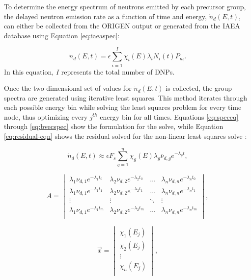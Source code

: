 \documentclass{style/nseJournal}
\begin{document}
To determine the energy spectrum of neutrons emitted by each precursor group, the delayed neutron emission rate as a function of time and energy, $\dot{n}_d(E, t)$, can either be collected from the ORIGEN output or generated from the IAEA database using Equation \eqref{eq:iaeaspec}:

\begin{equation}
\dot{n}_d(E, t) = \epsilon \sum_{i=1}^{I} \chi_i(E) \lambda_i N_{i}(t) P_{n_i}
\label{eq:iaeaspec}.
\end{equation}
In this equation, $I$ represents the total number of DNPs.

Once the two-dimensional set of values for $\dot{n}_d(E, t)$ is collected, the group spectra are generated using iterative least squares. This method iterates through each possible energy bin while solving the least squares problem for every time node, thus optimizing every $j^{th}$ energy bin for all times. Equations \eqref{eq:speceq} through \eqref{eq:bvecspec} show the formulation for the solve, while Equation \eqref{eq:residual-eqn} shows the residual solved for the non-linear least squares solve \cite{2020SciPy-NMeth, branch1999subspace}:

\begin{equation}
\dot{n}_d(E, t) \approx \epsilon F_s \sum_{g=1}^{n} \chi_g(E) \lambda_g \bar{\nu}_{d, g} e^{-\lambda_g t}
\label{eq:speceq},
\end{equation}

\begin{equation}
A = 
\begin{vmatrix}
\lambda_1 \nu_{d, 1} e^{-\lambda_1 t_0} & \lambda_2 \nu_{d, 2} e^{-\lambda_2 t_0} & \hdots &  \lambda_n \nu_{d, n} e^{-\lambda_n t_0}\\
\lambda_1 \nu_{d, 1} e^{-\lambda_1 t_1} & \lambda_2 \nu_{d, 2} e^{-\lambda_2 t_1} & \hdots &  \lambda_n \nu_{d, n} e^{-\lambda_n t_1}\\
\vdots                       & \vdots                       & \ddots &  \vdots                      \\
\lambda_1 \nu_{d, 1} e^{-\lambda_1 t_m} & \lambda_2 \nu_{d, 2} e^{-\lambda_2 t_m} &  \hdots  & \lambda_n \nu_{d, n} e^{-\lambda_n t_m}\\
\end{vmatrix},
\end{equation}

\begin{equation}
\vec{x} = 
\begin{vmatrix}
\chi_1(E_j)\\
\chi_2(E_j)\\
\vdots\\
\chi_n(E_j)\\
\end{vmatrix},
\end{equation}
\end{document}
